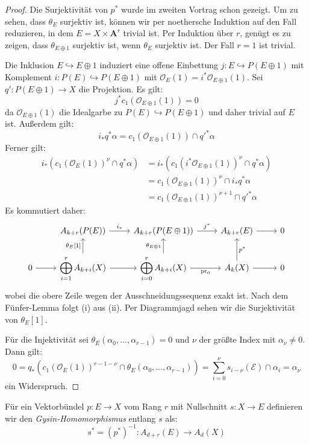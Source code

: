 \documentclass[10pt,b5paper]{article}
\begin{document}
\begin{proof}
Die Surjektivität von $p^\ast$ wurde im zweiten Vortrag schon gezeigt. Um zu sehen, dass $\theta_E$ surjektiv ist, können wir per noethersche Induktion auf den Fall reduzieren, in dem $E=X\times\mathbf{A}^r$ trivial ist. Per Induktion über $r$, genügt es zu zeigen, dass $\theta_{E\oplus 1}$ surjektiv ist, wenn $\theta_E$ surjektiv ist. Der Fall $r=1$ ist trivial.

Die Inklusion $E\hookrightarrow E\oplus 1$ induziert eine offene Einbettung $j: E\hookrightarrow P(E\oplus 1)$ mit Komplement $i: P(E)\hookrightarrow P(E\oplus 1)$ mit $\mathcal{O}_E(1)= i^\ast\mathcal{O}_{E\oplus 1}(1)$. Sei $q': P(E\oplus 1)\to X$ die Projektion. Es gilt:
\[ j^\ast c_1(\mathcal{O}_{E\oplus 1}(1)) = 0 \]
da $\mathcal{O}_{E\oplus 1}(1)$ die Idealgarbe zu $P(E)\hookrightarrow P(E\oplus 1)$ und daher trivial auf $E$ ist. Außerdem gilt:
\[ i_\ast q^\ast\alpha = c_1(\mathcal{O}_{E\oplus 1}(1))\cap q'^\ast\alpha \]
Ferner gilt:
\begin{align*}
i_\ast(c_1(\mathcal{O}_E(1))^\nu \cap q^\ast\alpha) &= i_\ast(c_1(i^\ast\mathcal{O}_{E\oplus 1}(1))^\nu \cap q^\ast\alpha)\\
&= c_1(\mathcal{O}_{E\oplus 1}(1))^\nu\cap i_\ast q^\ast \alpha\\
&= c_1(\mathcal{O}_{E\oplus 1}(1))^{\nu+1}\cap q'^\ast\alpha
\end{align*}
Es kommutiert daher:
\[\begin{tikzcd}
& A_{k + r}(P(E)) \rar["i_\ast"] & A_{k + r}(P(E\oplus 1)) \rar["j^\ast"] & A_{k + r}(E)\rar & 0\\
0 \rar & \displaystyle\bigoplus_{i=1}^r A_{k + i}(X) \rar \uar["\theta_E{[1]}"] & \displaystyle\bigoplus_{i=0}^r A_{k + i}(X) \uar["\theta_{E\oplus 1}"] \rar["\operatorname{pr}_0"']  & A_k(X) \rar\uar["p^\ast"'] & 0
\end{tikzcd}\]
wobei die obere Zeile wegen der Ausschneidungssequenz exakt ist. Nach dem Fünfer-Lemma folgt (i) aus (ii). Per Diagrammjagd sehen wir die Surjektivität von $\theta_E[1]$.

Für die Injektivität sei $\theta_E(\alpha_0,\ldots,\alpha_{r-1})=0$ und $\nu$ der größte Index mit $\alpha_\nu\neq 0$. Dann gilt:
\[ 0 = q_\ast(c_1(\mathcal{O}_E(1))^{r-1-\nu}\cap \theta_E(\alpha_0,\ldots,\alpha_{r-1})) = \sum_{i=0}^\nu s_{i-\nu}(\mathcal{E})\cap\alpha_i = \alpha_\nu \]
ein Widerspruch.
\end{proof}

\begin{definition}
Für ein Vektorbündel $p:E\to X$ vom Rang $r$ mit Nullschnitt $s:X\to E$ definieren wir den \textit{Gysin-Homomorphismus} entlang $s$ als:
\[ s^\ast = (p^\ast)^{-1}: A_{d+r}(E)\to A_d(X) \]
\end{definition}
\end{document}
